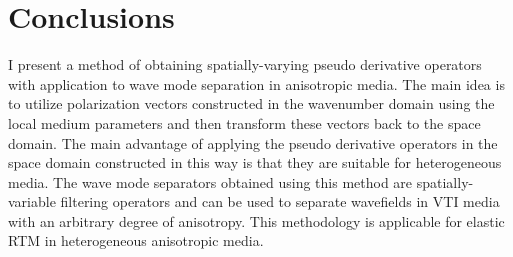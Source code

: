 
\section{Conclusions}
I present a method of obtaining spatially-varying pseudo derivative
operators with application to wave mode separation in anisotropic
media.  The main idea is to utilize polarization vectors constructed
in the wavenumber domain using the local medium parameters and then
transform these vectors back to the space domain.
The main advantage of applying the pseudo derivative operators in the
space domain constructed in this way is that they are suitable for
heterogeneous media.
The wave mode separators obtained using this method are
spatially-variable filtering operators and can be used to separate
wavefields in VTI media with an arbitrary degree of anisotropy. This
methodology is applicable for elastic RTM in heterogeneous anisotropic
media.

